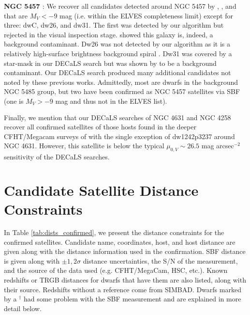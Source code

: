 \documentclass[twocolumn]{aastex62}
\begin{document}
\textbf{NGC 5457 \citep{javanmardi_m101, muller101, bennet2017}}: We recover all candidates detected around NGC 5457 by \citet{javanmardi_m101}, \citet{muller101}, and \citet{bennet2017} that are $M_V<-9$ mag (i.e. within the ELVES completeness limit) except for three: dwC, dw26, and dw31. The first was detected by our algorithm but rejected in the visual inspection stage. \citet{bennet2019} showed this galaxy is, indeed, a background contaminant. Dw26 was not detected by our algorithm as it is a relatively high-surface brightness background spiral \citep{bennet2017, sbf_m101}. Dw31 was covered by a star-mask in our DECaLS search but was shown by \citet{sbf_m101} to be a background contaminant. Our DECaLS search produced many additional candidates not noted by these previous works. Admittedly, most are dwarfs in the background NGC 5485 group, but two have been confirmed as NGC 5457 satellites via SBF (one is $M_V>-9$ mag and thus not in the ELVES list).



Finally, we mention that our DECaLS searches of NGC 4631 and NGC 4258 recover all confirmed satellites of those hosts found in the deeper CFHT/Megacam surveys of \citet{carlsten2020a} with the single exception of dw1242p3237 around NGC 4631. However, this satellite is below the typical $\mu_{0,V}\sim26.5$ mag arcsec$^{-2}$ sensitivity of the DECaLS searches.
















\section{Candidate Satellite Distance Constraints}
\label{app:distances}
In Table \ref{tab:dists_confirmed}, we present the distance constraints for the confirmed satellites. Candidate name, coordinates, host, and host distance are given along with the distance information used in the confirmation. SBF distance is given along with $\pm1,2\sigma$ distance uncertainties, the S/N of the measurement, and the source of the data used (e.g. CFHT/MegaCam, HSC, etc.). Known redshifts or TRGB distances for dwarfs that have them are also listed, along with their source. Redshifts without a reference come from SIMBAD. Dwarfs marked by a $^\dagger$ had some problem with the SBF measurement and are explained in more detail below.
\end{document}
